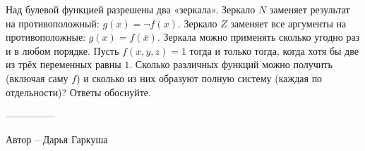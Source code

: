 \question
Над булевой функцией разрешены два «зеркала». Зеркало $N$ заменяет результат на противоположный: $g(x)=\neg f(x)$. Зеркало $Z$ заменяет все аргументы на противоположные: $g(x)=f(\overline{x})$. Зеркала можно применять сколько угодно раз и в любом порядке. Пусть $f(x,y,z)=1$ тогда и только тогда, когда хотя бы две из трёх переменных равны $1$. Сколько различных функций можно получить (включая саму $f$) и сколько из них образуют полную систему (каждая по отдельности)? Ответы обоснуйте.

---------------

Автор -- Дарья Гаркуша